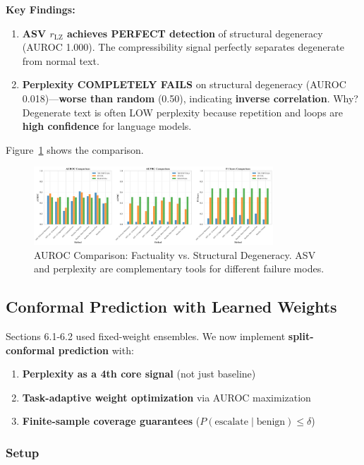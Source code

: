 \documentclass[10pt]{article}
\begin{document}
\textbf{Key Findings:}
\begin{enumerate}
\item \textbf{ASV $r_{\text{LZ}}$ achieves PERFECT detection} of structural degeneracy (AUROC 1.000). The compressibility signal perfectly separates degenerate from normal text.
\item \textbf{Perplexity COMPLETELY FAILS} on structural degeneracy (AUROC 0.018)---\textbf{worse than random} (0.50), indicating \textbf{inverse correlation}. Why? Degenerate text is often LOW perplexity because repetition and loops are \textbf{high confidence} for language models.
\end{enumerate}

Figure~\ref{fig:degeneracy-comparison} shows the comparison.

\begin{figure}[h]
\centering
\includegraphics[width=0.8\textwidth]{../../figures/comparison_bars.png}
\caption{AUROC Comparison: Factuality vs. Structural Degeneracy. ASV and perplexity are complementary tools for different failure modes.}
\label{fig:degeneracy-comparison}
\end{figure}

\subsection{Conformal Prediction with Learned Weights}
\label{sec:eval-conformal}

Sections 6.1-6.2 used fixed-weight ensembles. We now implement \textbf{split-conformal prediction} with:
\begin{enumerate}
\item \textbf{Perplexity as a 4th core signal} (not just baseline)
\item \textbf{Task-adaptive weight optimization} via AUROC maximization
\item \textbf{Finite-sample coverage guarantees} ($P(\text{escalate} \mid \text{benign}) \le \delta$)
\end{enumerate}

\subsubsection{Setup}
\end{document}
